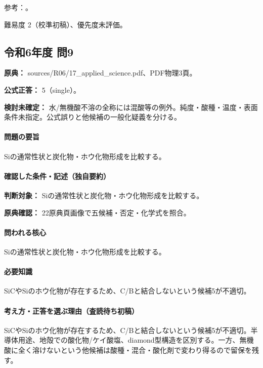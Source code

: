 \par 参考：\cite{inorganic_metalloid_ref,inorganic_sic,inorganic_sib6,inorganic_hf_etch}。

\par 難易度 2（校準初稿）、優先度未評価。

\subsection{令和6年度 問9}
\label{q:r06-reg-applied-09}

\noindent\textbf{原典：} sources/R06/17\_applied\_science.pdf、PDF物理3頁。

\textbf{公式正答：} 5（single）。

\par\textbf{検討未確定：} 水/無機酸不溶の全称には混酸等の例外。純度・酸種・温度・表面条件未指定。公式誤りと他候補の一般化疑義を分ける。

\paragraph{問題の要旨} Siの通常性状と炭化物・ホウ化物形成を比較する。

\paragraph{確認した条件・記述（独自要約）}\mbox{}\par

\noindent\textbf{判断対象：} Siの通常性状と炭化物・ホウ化物形成を比較する。\par

\noindent\textbf{原典確認：} 22原典頁画像で五候補・否定・化学式を照合。\par

\paragraph{問われる核心} Siの通常性状と炭化物・ホウ化物形成を比較する。

\paragraph{必要知識} SiCやSiのホウ化物が存在するため、C/Bと結合しないという候補5が不適切。

\paragraph{考え方・正答を選ぶ理由（査読待ち初稿）} SiCやSiのホウ化物が存在するため、C/Bと結合しないという候補5が不適切。半導体用途、地殻での酸化物/ケイ酸塩、diamond型構造を区別する。一方、無機酸に全く溶けないという他候補は酸種・混合・酸化剤で変わり得るので留保を残す。

